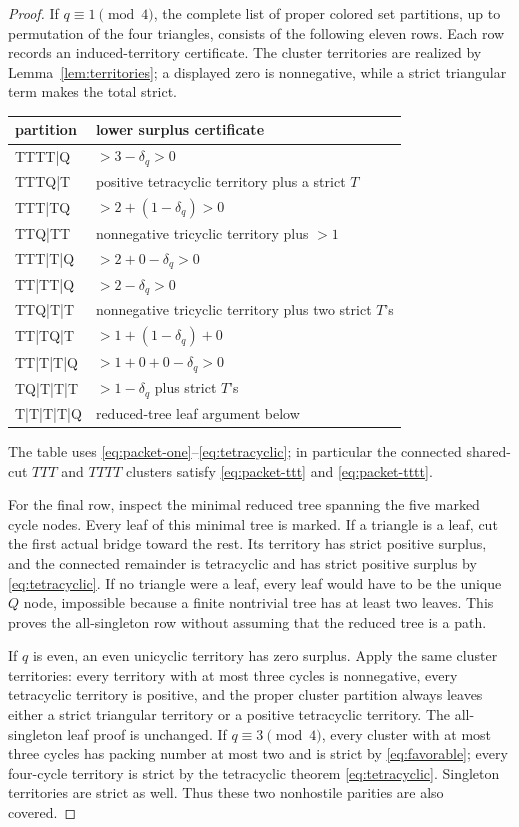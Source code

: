 \documentclass[11pt]{article}
\begin{document}
\begin{proof}
If $q\equiv1\pmod4$, the complete list of proper colored set partitions,
up to permutation of the four triangles, consists of the following eleven
rows.  Each row records an induced-territory certificate.  The cluster
territories are realized by Lemma~\ref{lem:territories}; a displayed zero is
nonnegative, while a strict triangular term makes the total strict.
\begin{center}
\renewcommand{\arraystretch}{1.14}
\begin{tabular}{>{\ttfamily}l l}
partition & lower surplus certificate\\ \hline
TTTT|Q & $>3-\delta_q>0$\\
TTTQ|T & positive tetracyclic territory plus a strict $T$\\
TTT|TQ & $>2+(1-\delta_q)>0$\\
TTQ|TT & nonnegative tricyclic territory plus $>1$\\
TTT|T|Q & $>2+0-\delta_q>0$\\
TT|TT|Q & $>2-\delta_q>0$\\
TTQ|T|T & nonnegative tricyclic territory plus two strict $T$'s\\
TT|TQ|T & $>1+(1-\delta_q)+0$\\
TT|T|T|Q & $>1+0+0-\delta_q>0$\\
TQ|T|T|T & $>1-\delta_q$ plus strict $T$'s\\
T|T|T|T|Q & reduced-tree leaf argument below
\end{tabular}
\end{center}
The table uses \eqref{eq:packet-one}--\eqref{eq:tetracyclic}; in particular
the connected shared-cut $TTT$ and $TTTT$ clusters satisfy
\eqref{eq:packet-ttt} and \eqref{eq:packet-tttt}.

For the final row, inspect the minimal reduced tree spanning the five marked
cycle nodes.  Every leaf of this minimal tree is marked.  If a triangle is a
leaf, cut the first actual bridge toward the rest.  Its territory has strict
positive surplus, and the connected remainder is tetracyclic and has strict
positive surplus by \eqref{eq:tetracyclic}.  If no triangle were a leaf, every
leaf would have to be the unique $Q$ node, impossible because a finite
nontrivial tree has at least two leaves.  This proves the all-singleton row
without assuming that the reduced tree is a path.

If $q$ is even, an even unicyclic territory has zero surplus.  Apply the same
cluster territories: every territory with at most three cycles is
nonnegative, every tetracyclic territory is positive, and the proper cluster
partition always leaves either a strict triangular territory or a positive
tetracyclic territory.  The all-singleton leaf proof is unchanged.  If
$q\equiv3\pmod4$, every cluster with at most three cycles has packing number
at most two and is strict by \eqref{eq:favorable}; every four-cycle territory
is strict by the tetracyclic theorem \eqref{eq:tetracyclic}.  Singleton
territories are strict as well.  Thus these two nonhostile parities are also
covered.
\end{proof}
\end{document}
